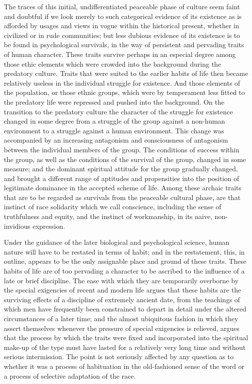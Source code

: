 \documentclass[12pt]{report}
\begin{document}
The traces of this initial, undifferentiated peaceable phase of culture
seem faint and doubtful if we look merely to such categorical evidence
of its existence as is afforded by usages and views in vogue within the
historical present, whether in civilized or in rude communities; but
less dubious evidence of its existence is to be found in psychological
survivals, in the way of persistent and pervading traits of human
character. These traits survive perhaps in an especial degree among
those ethic elements which were crowded into the background during the
predatory culture. Traits that were suited to the earlier habits of life
then became relatively useless in the individual struggle for existence.
And those elements of the population, or those ethnic groups, which
were by temperament less fitted to the predatory life were repressed and
pushed into the background. On the transition to the predatory culture
the character of the struggle for existence changed in some degree from
a struggle of the group against a non-human environment to a struggle
against a human environment. This change was accompanied by an
increasing antagonism and consciousness of antagonism between the
individual members of the group. The conditions of success within the
group, as well as the conditions of the survival of the group, changed
in some measure; and the dominant spiritual attitude for the group
gradually changed, and brought a different range of aptitudes and
propensities into the position of legitimate dominance in the accepted
scheme of life. Among these archaic traits that are to be regarded as
survivals from the peaceable cultural phase, are that instinct of race
solidarity which we call conscience, including the sense of truthfulness
and equity, and the instinct of workmanship, in its naive, non-invidious
expression.

Under the guidance of the later biological and psychological science,
human nature will have to be restated in terms of habit; and in the
restatement, this, in outline, appears to be the only assignable place
and ground of these traits. These habits of life are of too pervading a
character to be ascribed to the influence of a late or brief discipline.
The ease with which they are temporarily overborne by the special
exigencies of recent and modern life argues that these habits are the
surviving effects of a discipline of extremely ancient date, from the
teachings of which men have frequently been constrained to depart in
detail under the altered circumstances of a later time; and the almost
ubiquitous fashion in which they assert themselves whenever the pressure
of special exigencies is relieved, argues that the process by which the
traits were fixed and incorporated into the spiritual make-up of the
type must have lasted for a relatively very long time and without
serious intermission. The point is not seriously affected by any
question as to whether it was a process of habituation in the
old-fashioned sense of the word or a process of selective adaptation of
the race.
\end{document}
